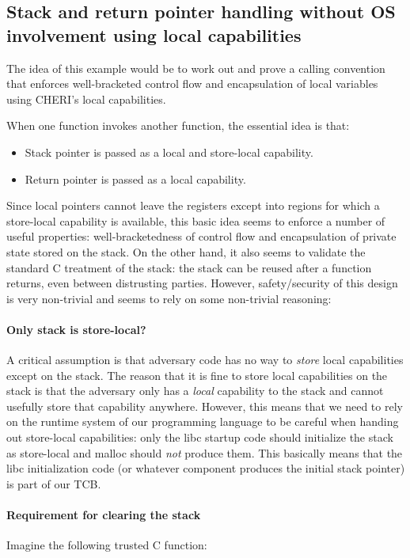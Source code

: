 \documentclass{article}
\begin{document}
\subsection{Stack and return pointer handling without OS involvement using local
  capabilities}
The idea of this example would be to work out and prove a calling convention
that enforces well-bracketed control flow and encapsulation of local variables
using CHERI's local capabilities.

When one function invokes another function, the essential idea is that:
\begin{itemize}
\item Stack pointer is passed as a local and store-local capability.
\item Return pointer is passed as a local capability.
\end{itemize}

Since local pointers cannot leave the registers except into regions for which a
store-local capability is available, this basic idea seems to enforce a number
of useful properties: well-bracketedness of control flow and encapsulation of
private state stored on the stack. On the other hand, it also seems to validate
the standard C treatment of the stack: the stack can be reused after a function
returns, even between distrusting parties. However, safety/security of this
design is very non-trivial and seems to rely on some non-trivial reasoning:

\paragraph{Only stack is store-local?}
A critical assumption is that adversary code has no way to \emph{store} local
capabilities except on the stack. The reason that it is fine to store local
capabilities on the stack is that the adversary only has a \emph{local}
capability to the stack and cannot usefully store that capability anywhere.
However, this means that we need to rely on the runtime system of our
programming language to be careful when handing out store-local capabilities:
only the libc startup code should initialize the stack as store-local and malloc
should \emph{not} produce them. This basically means that the libc
initialization code (or whatever component produces the initial stack pointer)
is part of our TCB.

\paragraph{Requirement for clearing the stack}
Imagine the following trusted C function:
\end{document}
